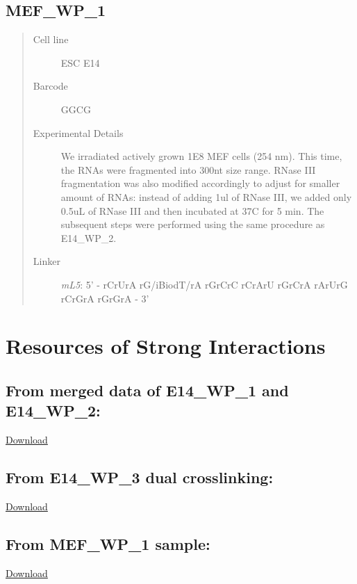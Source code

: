 \documentclass[letterpaper,10pt,english]{sphinxmanual}
\begin{document}
\subsection{MEF\_WP\_1}
\label{Data_Resources:mef-wp-1}\begin{quote}\begin{description}
\item[{Cell line}] \leavevmode
ESC E14

\item[{Barcode}] \leavevmode
GGCG

\item[{Experimental Details}] \leavevmode
We irradiated actively grown 1E8 MEF cells (254 nm). This time, the RNAs
were fragmented into 300nt size range. RNase III fragmentation was also modified accordingly
to adjust for smaller amount of RNAs: instead of adding 1ul of RNase III, we added only 0.5uL
of RNase III and then incubated at 37C for 5 min. The subsequent steps were performed using
the same procedure as E14\_WP\_2.

\item[{Linker}] \leavevmode
\emph{mL5}: 5' - rCrUrA rG/iBiodT/rA rGrCrC rCrArU rGrCrA rArUrG rCrGrA rGrGrA - 3'

\end{description}\end{quote}


\section{Resources of Strong Interactions}
\label{Data_Resources:resources-of-strong-interactions}

\subsection{From merged data of E14\_WP\_1 and E14\_WP\_2:}
\label{Data_Resources:from-merged-data-of-e14-wp-1-and-e14-wp-2}
\href{http://systemsbio.ucsd.edu/RNA-Hi-C/Data/ACCT\_GGCG\_interaction\_clusters.xlsx}{Download}


\subsection{From E14\_WP\_3 dual crosslinking:}
\label{Data_Resources:from-e14-wp-3-dual-crosslinking}
\href{http://systemsbio.ucsd.edu/RNA-Hi-C/Data/AATG\_interaction\_clusters.xlsx}{Download}


\subsection{From MEF\_WP\_1 sample:}
\label{Data_Resources:from-mef-wp-1-sample}
\href{http://systemsbio.ucsd.edu/RNA-Hi-C/Data/GGCG\_MEF\_interaction\_clusters.xlsx}{Download}
\end{document}
